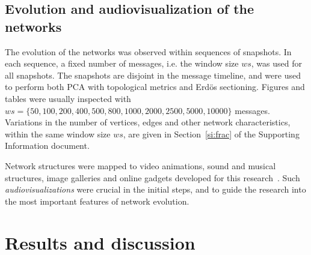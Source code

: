 \documentclass[%
aip,
jmp,%
amsmath,amssymb,
reprint,%
]{revtex4-1}
\begin{document}
\subsection{Evolution and audiovisualization of the networks}\label{sec:viz}
The evolution of the networks was observed within 
sequences of snapshots. In each sequence, a fixed number of messages,
i.e. the window size $ws$, was used for all snapshots.
The snapshots are disjoint in the message timeline, and were used to perform both PCA with topological metrics and Erd\"os sectioning.  
Figures and tables were usually inspected with 
$ws=\{50, 100, 200, 400, 500, 800, 1000, 2000, 2500, 5000, 10000\}$ messages. Variations in the number of vertices, edges
and other network characteristics, within the same window size $ws$,
are given in Section~\ref{si:frac} of the Supporting Information document. 

Network structures were mapped to video animations, sound and musical structures, image galleries and online gadgets developed for this research~\cite{animacoes,galGmane,appGmane}. Such \emph{audiovisualizations} were crucial in the initial steps, and
to guide the research into the most important features of network evolution.

\section{Results and discussion}\label{sec:results}
\end{document}
